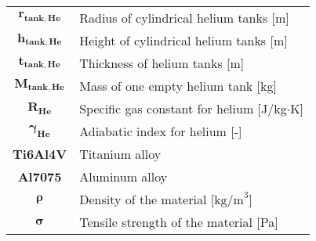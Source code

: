 \begin{multicols}{2}
{\begin{xltabular}{\linewidth}{c>{\raggedright\arraybackslash}X}
		$\boldsymbol{r_{tank,He}}$ & Radius of cylindrical helium tanks [m] \\
		$\boldsymbol{h_{tank,He}}$ & Height of cylindrical helium tanks [m] \\
		$\boldsymbol{t_{tank,He}}$ & Thickness of helium tanks [m] \\
		$\boldsymbol{M_{tank,He}}$ & Mass of one empty helium tank [kg] \\
		$\boldsymbol{R_{He}}$ & Specific gas constant for helium [J/kg$\cdot$K] \\
		$\boldsymbol{\gamma_{He}}$ & Adiabatic index for helium [-] \\
		\textbf{Ti6Al4V} & Titanium alloy \\
		\textbf{Al7075} & Aluminum alloy \\
		$\boldsymbol{\rho}$ & Density of the material [$\textrm{kg/m}^3$] \\
		$\boldsymbol{\sigma}$ & Tensile strength of the material [Pa]
	\end{xltabular}
	\unskip
	\unpenalty
	\unpenalty}
	\unvbox\ltmcbox
\end{multicols}